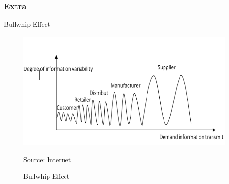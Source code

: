 \documentclass{beamer}
\begin{document}
\begin{frame}
\frametitle{Extra}
\begin{block}{Bullwhip Effect}
\begin{figure}
\centering
\includegraphics[width=11cm,height=6cm]{bullwhip}
\caption{Bullwhip Effect}{Source: Internet}
\end{figure}
\end{block}
\end{frame}
\end{document}
